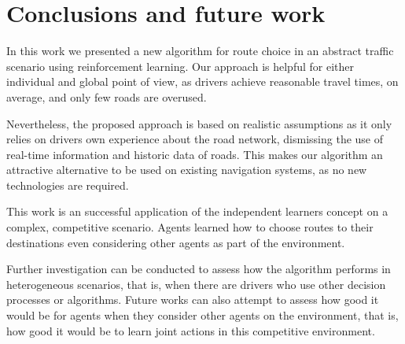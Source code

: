 \documentclass[12pt]{article}
\begin{document}
\section{Conclusions and future work}
\label{sec:conclusions}

In this work we presented a new algorithm for route choice in an abstract traffic scenario using reinforcement learning. Our approach is helpful for either individual and global point of view, as drivers achieve reasonable travel times, on average, and only few roads are overused.

Nevertheless, the proposed approach is based on realistic assumptions as it only relies on drivers own experience about the road network, dismissing the use of real-time information and historic data of roads. This makes our algorithm an attractive alternative to be used on existing navigation systems, as no new technologies are required.

This work is an successful application of the independent learners concept on a complex, competitive scenario. Agents learned how to choose routes to their destinations even considering other agents as part of the environment.

Further investigation can be conducted to assess how the algorithm performs in heterogeneous scenarios, that is, when there are drivers who use other decision processes or algorithms. Future works can also attempt to assess how good it would be for agents when they consider other agents on the environment, that is, how good it would be to learn joint actions in this competitive environment.


 
\end{document}
